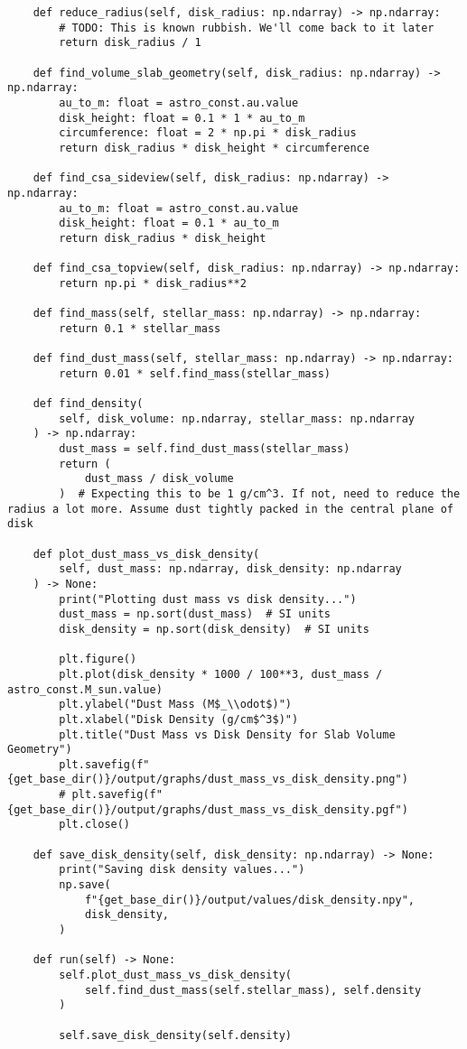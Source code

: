 \begin{lstlisting}
    def reduce_radius(self, disk_radius: np.ndarray) -> np.ndarray:
        # TODO: This is known rubbish. We'll come back to it later
        return disk_radius / 1

    def find_volume_slab_geometry(self, disk_radius: np.ndarray) -> np.ndarray:
        au_to_m: float = astro_const.au.value
        disk_height: float = 0.1 * 1 * au_to_m
        circumference: float = 2 * np.pi * disk_radius
        return disk_radius * disk_height * circumference

    def find_csa_sideview(self, disk_radius: np.ndarray) -> np.ndarray:
        au_to_m: float = astro_const.au.value
        disk_height: float = 0.1 * au_to_m
        return disk_radius * disk_height

    def find_csa_topview(self, disk_radius: np.ndarray) -> np.ndarray:
        return np.pi * disk_radius**2

    def find_mass(self, stellar_mass: np.ndarray) -> np.ndarray:
        return 0.1 * stellar_mass

    def find_dust_mass(self, stellar_mass: np.ndarray) -> np.ndarray:
        return 0.01 * self.find_mass(stellar_mass)

    def find_density(
        self, disk_volume: np.ndarray, stellar_mass: np.ndarray
    ) -> np.ndarray:
        dust_mass = self.find_dust_mass(stellar_mass)
        return (
            dust_mass / disk_volume
        )  # Expecting this to be 1 g/cm^3. If not, need to reduce the radius a lot more. Assume dust tightly packed in the central plane of disk

    def plot_dust_mass_vs_disk_density(
        self, dust_mass: np.ndarray, disk_density: np.ndarray
    ) -> None:
        print("Plotting dust mass vs disk density...")
        dust_mass = np.sort(dust_mass)  # SI units
        disk_density = np.sort(disk_density)  # SI units

        plt.figure()
        plt.plot(disk_density * 1000 / 100**3, dust_mass / astro_const.M_sun.value)
        plt.ylabel("Dust Mass (M$_\\odot$)")
        plt.xlabel("Disk Density (g/cm$^3$)")
        plt.title("Dust Mass vs Disk Density for Slab Volume Geometry")
        plt.savefig(f"{get_base_dir()}/output/graphs/dust_mass_vs_disk_density.png")
        # plt.savefig(f"{get_base_dir()}/output/graphs/dust_mass_vs_disk_density.pgf")
        plt.close()

    def save_disk_density(self, disk_density: np.ndarray) -> None:
        print("Saving disk density values...")
        np.save(
            f"{get_base_dir()}/output/values/disk_density.npy",
            disk_density,
        )

    def run(self) -> None:
        self.plot_dust_mass_vs_disk_density(
            self.find_dust_mass(self.stellar_mass), self.density
        )

        self.save_disk_density(self.density)
\end{lstlisting}